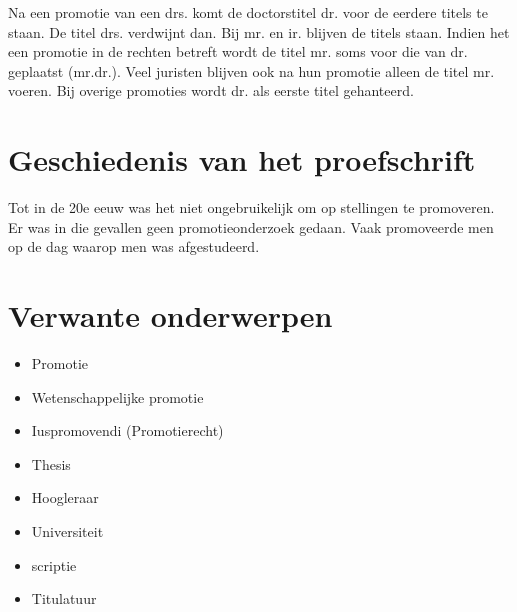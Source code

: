 Na een promotie van een drs. komt de doctorstitel dr. voor de eerdere
titels te staan. De titel drs. verdwijnt dan. Bij mr. en ir. blijven
de titels staan. Indien het een promotie in de rechten betreft wordt
de titel mr. soms voor die van dr. geplaatst (mr.dr.). Veel juristen
blijven ook na hun promotie alleen de titel mr. voeren. Bij overige
promoties wordt dr. als eerste titel gehanteerd.

\section{Geschiedenis van het proefschrift}
\label{sec:geschiedenis-van-het}


Tot in de 20e eeuw was het niet ongebruikelijk om op stellingen te
promoveren. Er was in die gevallen geen promotieonderzoek gedaan. Vaak
promoveerde men op de dag waarop men was afgestudeerd.

\section{Verwante onderwerpen}
\label{sec:verwante-onderwerpen}

\begin{itemize}
\item Promotie~\cite{h2g2}
\item Wetenschappelijke promotie
\item Iuspromovendi (Promotierecht)
\item Thesis
\item Hoogleraar
\item Universiteit
\item scriptie\cite{pratchett06:_good_omens}
\item Titulatuur
\end{itemize}

\cite{palaz2015analysis}
\cite{BiLSTM}

